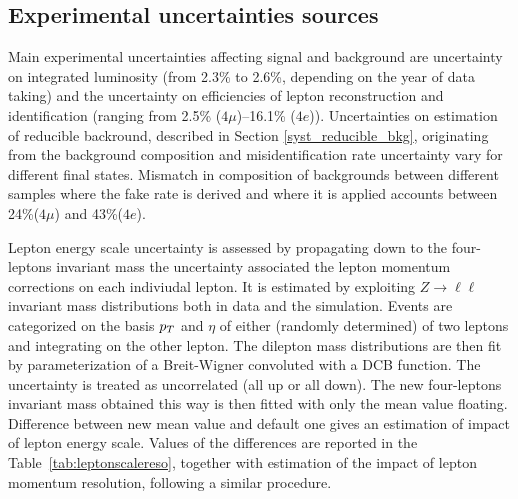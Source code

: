 \subsection{Experimental uncertainties sources}
Main experimental uncertainties affecting signal and background are uncertainty on integrated luminosity
(from 2.3\% to 2.6\%, depending on the year of data taking) and the uncertainty on efficiencies of lepton reconstruction and identification (ranging from 2.5\% ($4\mu$)--16.1\% ($4e$)). 
Uncertainties on estimation of reducible backround, %
described in Section \ref{syst_reducible_bkg},
originating from the background composition and misidentification rate uncertainty vary for different final states.
Mismatch in composition of backgrounds between different samples where the fake rate is derived and where it is applied accounts between 24\%($4\mu$) and 43\%($4e$).

Lepton energy scale uncertainty is assessed by propagating down to the four-leptons invariant mass the uncertainty associated the lepton momentum corrections on each indiviudal lepton. 
It is estimated by exploiting $Z\rightarrow\ell\ell$ invariant mass distributions both in data and the simulation. 
Events are categorized on the basis $p_T$ and $\eta$ of either (randomly determined) of two leptons and integrating on the other lepton. The dilepton mass distributions are then fit by parameterization of a Breit-Wigner convoluted with a DCB function.
The uncertainty is treated as uncorrelated (all up or all down). The new four-leptons invariant mass obtained this way is then fitted with only the mean value floating.
Difference between new mean value and default one gives an estimation of impact of lepton energy scale. 
Values of the differences are reported in the Table~\ref{tab:leptonscalereso}, together with estimation of the impact of lepton momentum resolution, following a similar procedure.




